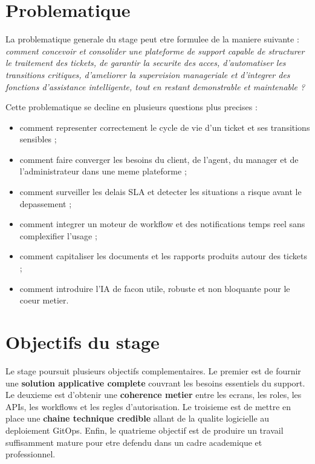\section{Problematique}

La problematique generale du stage peut etre formulee de la maniere suivante : \textit{comment concevoir et consolider une plateforme de support capable de structurer le traitement des tickets, de garantir la securite des acces, d'automatiser les transitions critiques, d'ameliorer la supervision manageriale et d'integrer des fonctions d'assistance intelligente, tout en restant demonstrable et maintenable ?}

Cette problematique se decline en plusieurs questions plus precises :

\begin{itemize}[leftmargin=1.2cm]
  \item comment representer correctement le cycle de vie d'un ticket et ses transitions sensibles ;
  \item comment faire converger les besoins du client, de l'agent, du manager et de l'administrateur dans une meme plateforme ;
  \item comment surveiller les delais SLA et detecter les situations a risque avant le depassement ;
  \item comment integrer un moteur de workflow et des notifications temps reel sans complexifier l'usage ;
  \item comment capitaliser les documents et les rapports produits autour des tickets ;
  \item comment introduire l'IA de facon utile, robuste et non bloquante pour le coeur metier.
\end{itemize}

\section{Objectifs du stage}

Le stage poursuit plusieurs objectifs complementaires. Le premier est de fournir une \textbf{solution applicative complete} couvrant les besoins essentiels du support. Le deuxieme est d'obtenir une \textbf{coherence metier} entre les ecrans, les roles, les APIs, les workflows et les regles d'autorisation. Le troisieme est de mettre en place une \textbf{chaine technique credible} allant de la qualite logicielle au deploiement GitOps. Enfin, le quatrieme objectif est de produire un travail suffisamment mature pour etre defendu dans un cadre academique et professionnel.

